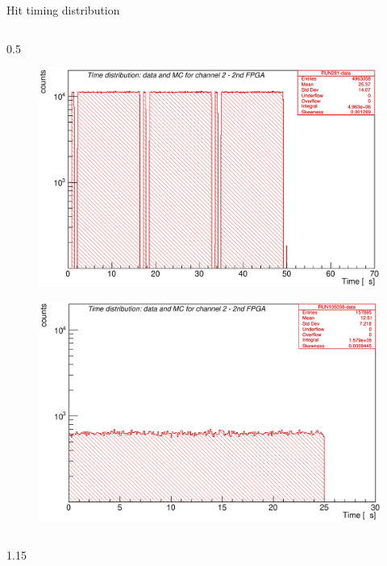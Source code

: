 \documentclass{beamer}
\begin{document}
\begin{frame}{Hit timing distribution}
\begin{columns}
            \begin{column}{0.5\framewidth}
                \begin{figure}[H]
                  \centering
                            \hspace*{-1em}
                \includegraphics[width=0.85\columnwidth]{figures/png/Screenshot_20241013_115554.png}
                  \label{fig:enter-label} 
                  \end{figure} 
                  \vspace{-4mm}
                  \begin{figure}[H]
                    \centering
                              \hspace*{-1em}
                  \includegraphics[width=0.85\columnwidth]{figures/png/Screenshot_20241013_115705.png}
                    \label{fig:enter-label} 
                    \end{figure} 
            \end{column}
        \end{columns}
        \begin{columns}

            \begin{column}{1.15\framewidth}
                \setlength{\leftmargini}{1.3em}


\end{column}
\end{columns}
\end{frame}
\end{document}

